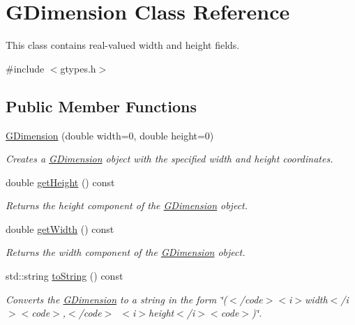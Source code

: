 \hypertarget{classGDimension}{}\section{G\+Dimension Class Reference}
\label{classGDimension}


This class contains real-\/valued width and height fields.  




{\ttfamily \#include $<$gtypes.\+h$>$}

\subsection*{Public Member Functions}
\begin{DoxyCompactItemize}
\item 
\mbox{\hyperlink{classGDimension_a6b8171acdd56ca62c8bea0f73bd27ea7}{G\+Dimension}} (double width=0, double height=0)
\begin{DoxyCompactList}\small\item\em Creates a {\ttfamily \mbox{\hyperlink{classGDimension}{G\+Dimension}}} object with the specified {\ttfamily width} and {\ttfamily height} coordinates. \end{DoxyCompactList}\item 
double \mbox{\hyperlink{classGDimension_a1e7e353362434072875264cf95629f99}{get\+Height}} () const
\begin{DoxyCompactList}\small\item\em Returns the height component of the {\ttfamily \mbox{\hyperlink{classGDimension}{G\+Dimension}}} object. \end{DoxyCompactList}\item 
double \mbox{\hyperlink{classGDimension_a0ed2965abd4f5701d2cadf71239faf19}{get\+Width}} () const
\begin{DoxyCompactList}\small\item\em Returns the width component of the {\ttfamily \mbox{\hyperlink{classGDimension}{G\+Dimension}}} object. \end{DoxyCompactList}\item 
std\+::string \mbox{\hyperlink{classGDimension_a1fe5121d6528fdea3f243321b3fa3a49}{to\+String}} () const
\begin{DoxyCompactList}\small\item\em Converts the {\ttfamily \mbox{\hyperlink{classGDimension}{G\+Dimension}}} to a string in the form {\ttfamily \char`\"{}($<$/code$>$$<$i$>$width$<$/i$>$$<$code$>$,$<$/code$>$~$<$i$>$height$<$/i$>$$<$code$>$)\char`\"{}}. \end{DoxyCompactList}\end{DoxyCompactItemize}
